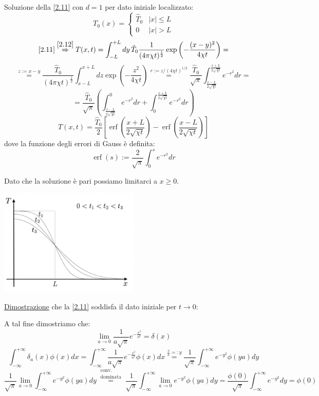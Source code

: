 \documentclass[a4paper,11pt]{report}
\begin{document}
Soluzione della \eqref{2.11} con $d=1$ per dato iniziale localizzato:
\[
T_0(x)=\left\{\begin{matrix}
 \hat{T}_0 & |x|\leq L \\ 
 0 & |x| > L
\end{matrix}\right.
\]
\[
\eqref{2.11}\overset{\eqref{2.12}}{\Rightarrow} T(x,t)=\int_{-L}^{+L}dy \, \hat{T}_0 \frac{1}{(4\pi\chi t)^\frac{1}{2}}\exp{\left(-\frac{(x-y)^2}{4\chi t}\right)}=
\]
\[
\overset{z:=x-y}{=}\frac{\hat{T}_0}{(4\pi\chi t)^\frac{1}{2}}\int_{x-L}^{x+L}dz \exp{\left(-\frac{z^2}{4\chi t}\right)}\overset{r:={z}/{(4\chi t)^{1/2}}}{=}\frac{\hat{T}_0}{\sqrt{\pi}}\int_{\frac{x-L}{2\sqrt{\chi t}}}^{\frac{x+L}{2\sqrt{\chi t}}} e^{-r^2}dr=
\]
\[
=\frac{\hat{T}_0}{\sqrt{\pi}}\left(\int_{\frac{x-L}{2\sqrt{\chi t}}}^{0}e^{-r^2}dr + \int_0^{\frac{x+L}{2\sqrt{\chi t}}}e^{-r^2}dr\right)
\]
\begin{equation}
T(x,t)=\frac{\hat{T}_0}{2}\left[\operatorname{erf}\left(\frac{x+L}{2\sqrt{\chi t}}\right)-\operatorname{erf}\left(\frac{x-L}{2\sqrt{\chi t}}\right)\right]
\end{equation}
dove la funzione degli errori di Gauss \`e definita:
\begin{equation}
\operatorname{erf}(s):=\frac{2}{\sqrt{\pi}}\int_0^s e^{-r^2}dr
\end{equation}

Dato che la soluzione \`e pari possiamo limitarci a $x\geq 0$.
\begin{center}
\includegraphics[width=0.5\textwidth]{immagini/calore}
\end{center}

\underline{Dimostrazione} che la \eqref{2.11} soddisfa il dato iniziale per $t\rightarrow 0$:

A tal fine dimostriamo che:
\[
\lim_{a \to 0} \frac{1}{a\sqrt{\pi}}e^{-\frac{x^2}{a^2}}=\delta(x)
\]
\[
\int_{-\infty}^{+\infty}\delta_a(x)\phi(x)dx=\int_{-\infty}^{+\infty}\frac{1}{a\sqrt{\pi}}e^{-\frac{x^2}{a^2}}\phi(x)dx\overset{\frac{x}{a}=:y}{=}\frac{1}{\sqrt{\pi}}\int_{-\infty}^{+\infty}e^{-y^2}\phi(ya)dy
\]
\[
\frac{1}{\sqrt{\pi}}\lim_{a\to 0}\int_{-\infty}^{+\infty}e^{-y^2}\phi(ya)dy\overset{\substack{\text{conv.}\\ \text{dominata}}}{=}
\frac{1}{\sqrt{\pi}}\int_{-\infty}^{+\infty}\lim_{a\to 0}e^{-y^2}\phi(ya)dy=\frac{\phi(0)}{\sqrt{\pi}}\int_{-\infty}^{+\infty}e^{-y^2}dy=\phi(0)
\]
\end{document}
